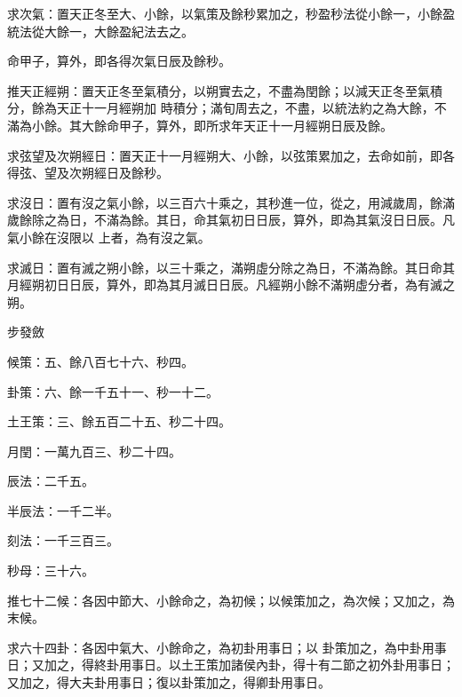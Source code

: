 \begin{pinyinscope}
 求次氣：置天正冬至大、小餘，以氣策及餘秒累加之，秒盈秒法從小餘一，小餘盈統法從大餘一，大餘盈紀法去之。



 命甲子，算外，即各得次氣日辰及餘秒。



 推天正經朔：置天正冬至氣積分，以朔實去之，不盡為閏餘；以減天正冬至氣積分，餘為天正十一月經朔加
 時積分；滿旬周去之，不盡，以統法約之為大餘，不滿為小餘。其大餘命甲子，算外，即所求年天正十一月經朔日辰及餘。



 求弦望及次朔經日：置天正十一月經朔大、小餘，以弦策累加之，去命如前，即各得弦、望及次朔經日及餘秒。



 求沒日：置有沒之氣小餘，以三百六十乘之，其秒進一位，從之，用減歲周，餘滿歲餘除之為日，不滿為餘。其日，命其氣初日日辰，算外，即為其氣沒日日辰。凡氣小餘在沒限以
 上者，為有沒之氣。



 求滅日：置有滅之朔小餘，以三十乘之，滿朔虛分除之為日，不滿為餘。其日命其月經朔初日日辰，算外，即為其月滅日日辰。凡經朔小餘不滿朔虛分者，為有滅之朔。



 步發斂



 候策：五、餘八百七十六、秒四。



 卦策：六、餘一千五十一、秒一十二。



 土王策：三、餘五百二十五、秒二十四。



 月閏：一萬九百三、秒二十四。



 辰法：二千五。



 半辰法：一千二半。



 刻法：一千三百三。



 秒母：三十六。



 推七十二候：各因中節大、小餘命之，為初候；以候策加之，為次候；又加之，為末候。



 求六十四卦：各因中氣大、小餘命之，為初卦用事日；以
 卦策加之，為中卦用事日；又加之，得終卦用事日。以土王策加諸侯內卦，得十有二節之初外卦用事日；又加之，得大夫卦用事日；復以卦策加之，得卿卦用事日。




\end{pinyinscope}
